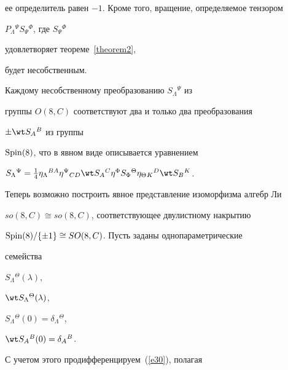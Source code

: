 ее определитель равен $-1$. Кроме того, вращение, определяемое тензором


$P_\Lambda{}^\Psi S_\Psi{}^\Phi$, где $S_\Psi{}^\Phi$


удовлетворяет теореме~\ref{theorem2},


будет несобственным.





\begin{thm}


\label{theorem3}


Каждому несобственному преобразованию $S_\Lambda{}^\Psi$ из


группы $O(8,C)$ соответствуют два и только два преобразования


$\pm \wt S_A{}^B$ из группы


$\operatorname{Spin}(8)$, что в явном виде описывается уравнением




$S_\Lambda{}^\Psi=\frac{1}{4}\eta_\Lambda{}^{BA}\eta^\Psi{}_{CD}


\wt S_A{}^C\eta^\Phi S_\Phi{}^\Theta\eta_\Theta{}_K{}^D\wt S_B{}^K$.




\end{thm}





Теперь возможно построить явное представление изоморфизма алгебр Ли


$so(8,C)\cong so(8,C)$, соответствующее двулистному накрытию


$\operatorname{Spin}(8)/\{\pm 1\} \cong SO(8,C)$. Пусть заданы однопараметрические


семейства




$S_\Lambda{}^\Theta(\lambda)$,


$\wt S_\Lambda{}^\Theta(\lambda)$,


$S_\Lambda{}^\Theta(0)=\delta_\Lambda{}^\Theta$,


$\wt S_A{}^B(0)=\delta_A{}^B$.




С учетом этого продифференцируем~(\ref{e30}), полагая


